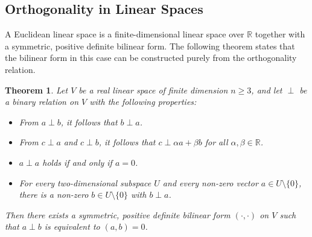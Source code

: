 \documentclass[11pt,a4paper]{article}
\newtheorem{theorem}{Theorem}[section]
\begin{document}
\subsection{Orthogonality in Linear Spaces}

A Euclidean linear space is a finite-dimensional linear space over $\mathbb{R}$ together with a symmetric, positive definite bilinear form. The following theorem states that the bilinear form in this case can be constructed purely from the orthogonality relation.

\begin{theorem} \label{thm:ortho_to_inner_product}
Let $V$ be a real linear space of finite dimension $n \ge 3$, and let $\perp$ be a binary relation on $V$ with the following properties:
\begin{itemize}
    \item[(S1)] From $a \perp b$, it follows that $b \perp a$.
    \item[(S2)] From $c \perp a$ and $c \perp b$, it follows that $c \perp \alpha a + \beta b$ for all $\alpha, \beta \in \mathbb{R}$.
    \item[(S3)] $a \perp a$ holds if and only if $a = 0$.
    \item[(S4)] For every two-dimensional subspace $U$ and every non-zero vector $a \in U \setminus \{0\}$, there is a non-zero $b \in U \setminus \{0\}$ with $b \perp a$.
\end{itemize}
Then there exists a symmetric, positive definite bilinear form $(\cdot, \cdot)$ on $V$ such that $a \perp b$ is equivalent to $(a, b) = 0$.
\end{theorem}
\end{document}
